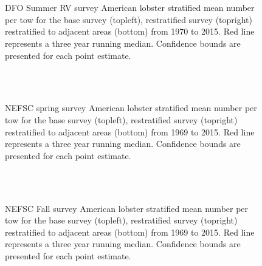 \documentclass[11pt]{article}
\newcommand{\e}{/backup/bio_data/bio.lobster/figures/} %
\begin{document}
\begin{figure}
\centering
{}
\\
\\

\caption{DFO Summer RV survey American lobster stratified mean number per tow for the base survey (topleft), restratified survey (topright) restratified to adjacent areas (bottom) from 1970 to 2015. Red line represents a three year running median. Confidence bounds are presented for each point estimate. }
\end{figure}
\clearpage

\begin{figure}
\centering
{}
\\
\\

\caption{NEFSC spring survey American lobster stratified mean number per tow for the base survey (topleft), restratified survey (topright) restratified to adjacent areas (bottom) from 1969 to 2015. Red line represents a three year running median. Confidence bounds are presented for each point estimate. }
\end{figure}
\clearpage


\begin{figure}
\centering
{}
\\
\\

\caption{NEFSC Fall survey American lobster stratified mean number per tow for the base survey (topleft), restratified survey (topright) restratified to adjacent areas (bottom) from 1969 to 2015. Red line represents a three year running median. Confidence bounds are presented for each point estimate. }
\end{figure}
\clearpage
\end{document}
